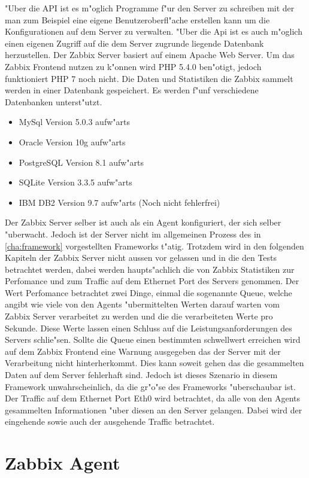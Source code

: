 "Uber die API ist es m"oglich Programme f"ur den Server zu schreiben mit der man zum Beispiel %
eine eigene Benutzeroberfl"ache erstellen kann um die Konfigurationen auf dem Server zu verwalten. %
"Uber die Api ist es auch m"oglich einen eigenen Zugriff auf die dem Server zugrunde liegende %
Datenbank herzustellen. %
Der Zabbix Server basiert auf einem Apache Web Server. Um das Zabbix Frontend nutzen zu k"onnen wird %
PHP 5.4.0 ben"otigt, jedoch funktioniert PHP 7 noch nicht. Die Daten und Statistiken die Zabbix sammelt %
werden in einer Datenbank gespeichert. Es werden f"unf verschiedene Datenbanken unterst"utzt. %
\begin{itemize}
\item MySql Version 5.0.3 aufw"arts
\item Oracle Version 10g aufw"arts
\item PostgreSQL Version 8.1 aufw"arts
\item SQLite Version 3.3.5 aufw"arts
\item IBM DB2 Version 9.7 aufw"arts (Noch nicht fehlerfrei)
\end{itemize}
\autocite{zabbix:req}
Der Zabbix Server selber ist auch als ein Agent konfiguriert, der sich selber "uberwacht. Jedoch ist der Server %
nicht im allgemeinen Prozess des in \cref{cha:framework} vorgestellten Frameworks t"atig. %
Trotzdem wird in den folgenden Kapiteln der Zabbix Server nicht aussen vor gelassen und in die %
den Tests betrachtet werden, dabei werden haupts"achlich die von Zabbix Statistiken zur Perfomance und zum %
Traffic auf dem Ethernet Port des Servers genommen. Der Wert Perfomance betrachtet zwei Dinge, einmal die sogenannte Queue, welche %
angibt wie viele von den Agents "ubermittelten Werten darauf warten vom Zabbix Server verarbeitet zu werden und die %
die verarbeiteten Werte pro Sekunde. Diese Werte lassen einen Schluss auf die Leistungsanforderungen des Servers schlie"sen. %
Sollte die Queue einen bestimmten schwellwert erreichen wird auf dem Zabbix Frontend eine Warnung ausgegeben das der %
Server mit der Verarbeitung nicht hinterherkommt. Dies kann soweit gehen das die gesammelten Daten auf dem Server fehlerhaft %
sind. Jedoch ist dieses Szenario in diesem Framework unwahrscheinlich, da die gr"o"se des %
Frameworks "uberschaubar ist. Der Traffic auf dem Ethernet Port Eth0 wird betrachtet, da alle von den Agents gesammelten Informationen %
"uber diesen an den Server gelangen. Dabei wird der eingehende sowie auch der ausgehende Traffic betrachtet.

\section{Zabbix Agent}

